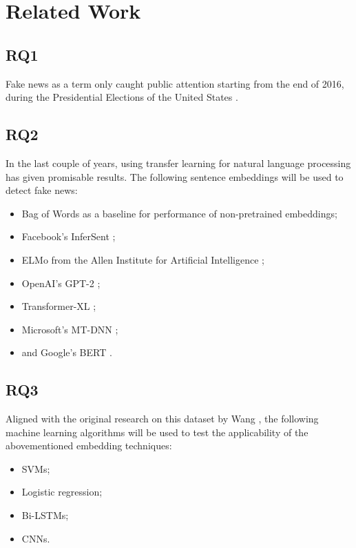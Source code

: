 \section{Related Work}

\subsection{RQ1}
Fake news as a term only caught public attention starting from the end of 2016, during the Presidential Elections of the United States \cite{googletrends2019}.   

\subsection{RQ2}
In the last couple of years, using transfer learning for natural language processing has given promisable results. The following sentence embeddings will be used to detect fake news:

\begin{itemize}
    \item Bag of Words as a baseline for performance of non-pretrained embeddings;
    \item Facebook's InferSent \cite{conneau2017};
    \item ELMo from the Allen Institute for Artificial Intelligence \cite{peters2018};
    \item OpenAI's GPT-2 \cite{radford2019};
    \item Transformer-XL \cite{dai2019};
    \item Microsoft's MT-DNN  \cite{liu2019};
    \item and Google's BERT \cite{devlin2018}.
\end{itemize}

\subsection{RQ3}
Aligned with the original research on this dataset by Wang \cite{wang2018}, the following machine learning algorithms will be used to test the applicability of the abovementioned embedding techniques: 
\begin{itemize}
    \item SVMs;
    \item Logistic regression;
    \item Bi-LSTMs;
    \item CNNs.
\end{itemize}